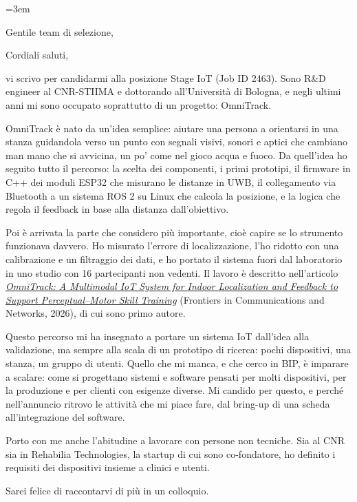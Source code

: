 \documentclass[11pt,a4paper,sans]{moderncv}
\begin{document}
  \emergencystretch=3em


\date{13 ottobre 2026}
\opening{Gentile team di selezione,}
\closing{Cordiali saluti,}
\makelettertitle

vi scrivo per candidarmi alla posizione Stage IoT (Job ID 2463). Sono R\&D engineer al CNR-STIIMA e dottorando all'Università di Bologna, e negli ultimi anni mi sono occupato soprattutto di un progetto: OmniTrack.

OmniTrack è nato da un'idea semplice: aiutare una persona a orientarsi in una stanza guidandola verso un punto con segnali visivi, sonori e aptici che cambiano man mano che si avvicina, un po' come nel gioco acqua e fuoco. Da quell'idea ho seguito tutto il percorso: la scelta dei componenti, i primi prototipi, il firmware in C++ dei moduli ESP32 che misurano le distanze in UWB, il collegamento via Bluetooth a un sistema ROS 2 su Linux che calcola la posizione, e la logica che regola il feedback in base alla distanza dall'obiettivo.

Poi è arrivata la parte che considero più importante, cioè capire se lo strumento funzionava davvero. Ho misurato l'errore di localizzazione, l'ho ridotto con una calibrazione e un filtraggio dei dati, e ho portato il sistema fuori dal laboratorio in uno studio con 16 partecipanti non vedenti. Il lavoro è descritto nell'articolo \href{https://www.frontiersin.org/journals/communications-and-networks/articles/10.3389/frcmn.2026.1829998/abstract}{\color{blue}\textit{OmniTrack: A Multimodal IoT System for Indoor Localization and Feedback to Support Perceptual--Motor Skill Training}} (Frontiers in Communications and Networks, 2026), di cui sono primo autore.

Questo percorso mi ha insegnato a portare un sistema IoT dall'idea alla validazione, ma sempre alla scala di un prototipo di ricerca: pochi dispositivi, una stanza, un gruppo di utenti. Quello che mi manca, e che cerco in BIP, è imparare a scalare: come si progettano sistemi e software pensati per molti dispositivi, per la produzione e per clienti con esigenze diverse. Mi candido per questo, e perché nell'annuncio ritrovo le attività che mi piace fare, dal bring-up di una scheda all'integrazione del software.

Porto con me anche l'abitudine a lavorare con persone non tecniche. Sia al CNR sia in Rehabilia Technologies, la startup di cui sono co-fondatore, ho definito i requisiti dei dispositivi insieme a clinici e utenti.

Sarei felice di raccontarvi di più in un colloquio.

\makeletterclosing
\end{document}
